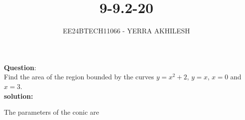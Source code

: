 \documentclass[journal]{IEEEtran}
\begin{document}

\vspace{3cm}

\title{9-9.2-20}
\author{EE24BTECH11066 - YERRA AKHILESH
}
{\let\newpage\relax\maketitle}

\renewcommand{\thefigure}{\theenumi}
\renewcommand{\thetable}{\theenumi}
\setlength{\intextsep}{10pt} %


\renewcommand{\thetable}{\theenumi}
\textbf{Question}:\\
Find the area of the region bounded by the curves $y = x^2+2$, $y = x$, $x = 0$ and $x = 3$.
\\
\textbf{solution: }
\begin{table}[h!]
    \centering
    
\end{table}
The parameters of the conic are\\
\begin{table}[h!]
    \centering
    
    \label{Table2}
\end{table}
\end{document}
